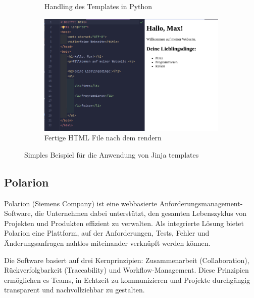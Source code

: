 \documentclass[a4paper, 12pt]{article}
\begin{document}
\begin{figure}[H]
\begin{subfigure}{0.55\textwidth}
        \caption{Handling des Templates in Python}
        \label{fig:jinja_python_code}
    \end{subfigure}
	\hspace*{3.5cm}
    \begin{subfigure}{0.6\textwidth}
        \includegraphics[width=\linewidth]{jinja_fertige_html_file.png}
        \caption{Fertige HTML File nach dem rendern}
        \label{fig:jinja_fertige_html_file}
    \end{subfigure}

    \caption{Simples Beispiel für die Anwendung von Jinja templates}
    \label{fig:jinja_example}
\end{figure}

\subsection{Polarion}\label{polarion}
Polarion (Siemens Company) ist eine webbasierte Anforderungsmanagement-Software, die Unternehmen dabei unterstützt, den gesamten Lebenszyklus von Projekten und Produkten effizient zu verwalten. Als integrierte Lösung bietet Polarion eine Plattform, auf der Anforderungen, Tests, Fehler und Änderungsanfragen nahtlos miteinander verknüpft werden können.

Die Software basiert auf drei Kernprinzipien: Zusammenarbeit (Collaboration), Rückverfolgbarkeit (Traceability) und Workflow-Management. Diese Prinzipien ermöglichen es Teams, in Echtzeit zu kommunizieren und Projekte durchgängig transparent und nachvollziehbar zu gestalten.
\end{document}
